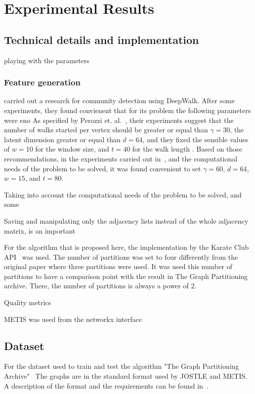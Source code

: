 %
%
\let\textcircled=\pgftextcircled
\chapter{Experimental Results}
\label{Chapter4}

\section{Technical details and implementation}
playing with the parameters
\subsection{Feature generation}
\cite{deepwalk_hyper} carried out a research for community detection using DeepWalk. After some experiments, they found convienent that for its problem the following parameters were eno 
As specified by Perozzi et. al.~\cite{deepwalk}, their experiments suggest that the number of walks started per vertex should be greater or equal than $\gamma=30$, the latent dimension greater or equal than $d=64$, and they fixed the sensible values of $w=10$ for the window size, and $t=40$ for the walk length . Based on those recommendations, in the experiments carried out in~\cite{deepwalk_hyper}, and the computational needs of the problem to be solved, it was found convenient to set $\gamma=60$, $d=64$, $w=15$, and $t=80$.

Taking into account the computational needs of the problem to be solved, and some 

Saving and manipulating only the adjacency lists instead of the whole adjacency matrix, is an important 

For the algorithm that is proposed here, the implementation by the Karate Club API~\cite{karateclub} was used.
The number of partitions was set to four differently from the original paper where three partitions were used. It was used this number of partitions to have a comparison point with the result in The Graph Partitioning archive. There, the number of partitions is always a power of $2$.

Quality metrics

METIS was used from the networkx interface

\section{Dataset}

    For the dataset used to train and test the algorithm "The Graph Partitioning Archive"~\cite{archive}
The graphs are in the standard format used by JOSTLE and METIS. A description of the format and the requirements can be found in~\cite{jostle}.


